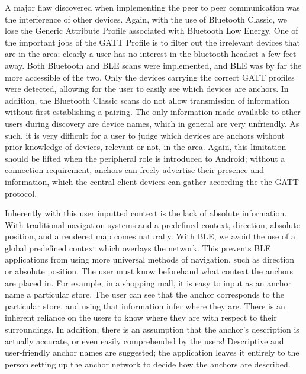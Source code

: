 \documentclass{sig-alternate}
\begin{document}
A major flaw discovered when implementing the peer to peer
communication was the interference of other devices. Again,
with the use of Bluetooth Classic, we lose the Generic Attribute
Profile associated with Bluetooth Low Energy. One of the 
important jobs of the GATT Profile is to filter out the 
irrelevant devices that are in the area; clearly a user has no
interest in the bluetooth headset a few feet away. Both 
Bluetooth and BLE scans were implemented, and BLE 
was by far the more accessible of the two. Only the devices
carrying the correct GATT profiles were detected, allowing
for the user to easily see which devices are anchors.
In addition, the Bluetooth Classic scans do not allow 
transmission of information without first establishing a 
pairing. The only information made available to other users
during discovery are device names, which in general are 
very unfriendly. As such, it is very difficult for a user to judge 
which devices are anchors without prior knowledge of devices,
relevant or not, in the area. Again, this limitation should be 
lifted when the peripheral role is introduced to Android; without 
a connection requirement, anchors can freely advertise their
presence and information, which the central client devices
can gather according the the GATT protocol.

Inherently with this user inputted context is the lack of 
absolute information. With traditional navigation systems and
a predefined context, direction, absolute position, and 
a rendered map comes naturally. With BLE, we avoid
the use of a global predefined context which overlays
the network. This prevents BLE applications from using more
universal methods of navigation, such as direction or absolute
position. The user must know beforehand what context
the anchors are placed in. For example, in a shopping
mall, it is easy to input as an anchor name a particular
store. The user can see that the anchor corresponds to 
the particular store, and using that information infer 
where they are. There is an inherent reliance on the
users to know where they are with respect to their
surroundings. In addition, there is an assumption
that the anchor's description is actually accurate, or even
easily comprehended by the users! Descriptive and
user-friendly anchor names are suggested; the
application leaves it entirely to the person setting
up the anchor network to decide how the anchors
are described.
\end{document}
